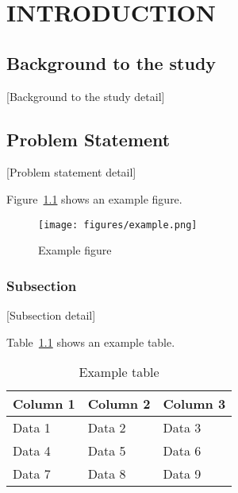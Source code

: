 \chapter{INTRODUCTION}

\section{Background to the study}
 [Background to the study detail]

\section{Problem Statement}
 [Problem statement detail]

Figure~\ref{fig:example_fig} shows an example figure.

\begin{figure}[h!]
    \centering
    \texttt{[image: figures/example.png]}
    \caption{Example figure}
    \label{fig:example_fig}
\end{figure}

\subsection{Subsection}
[Subsection detail]

Table~\ref{tab:example_tab} shows an example table.
\begin{table}[h]
    \centering
    \caption{Example table}
    \label{tab:example_tab}
    \begin{tabularx}{\textwidth}{|X|X|X|}
        \hline
        \textbf{Column 1} & \textbf{Column 2} & \textbf{Column 3} \\
        \hline
        Data 1            & Data 2            & Data 3            \\
        \hline
        Data 4            & Data 5            & Data 6            \\
        \hline
        Data 7            & Data 8            & Data 9            \\
        \hline
    \end{tabularx}
\end{table}